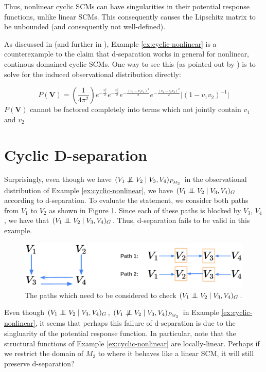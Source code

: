 \documentclass[12pt]{article}
\begin{document}
Thus, nonlinear cyclic SCMs can have singularities in their potential response functions, unlike linear SCMs. This consequently causes the Lipschitz matrix to be unbounded (and consequently not well-defined).


\begin{remark}
As discussed in \cite{Acyclification} (and further in \cite{Foundations}), Example \ref{ex:cyclic-nonlinear} is a counterexample to the claim that d-separation works in general for nonlinear, continous domained cyclic SCMs.
One way to see this (as pointed out by \cite{Acyclification}) is to solve for the induced observational distribution directly:

\[
P(\mathbf{V})=(\frac{1}{4\pi^2})e^{-\frac{v_1^2}{2}}e^{-\frac{v_2^2}{2}}e^{-\frac{(v_3-v_1v_4)^2}{2}}e^{-\frac{(v_4-v_2v_3)^2}{2}}\lvert(1-v_1v_2)^{-1}\rvert
\]
$P(\mathbf{V})$ cannot be factored completely into terms which not jointly contain $v_1$ and $v_2$
\end{remark}

\section{Cyclic D-separation}\label{cyclic-d-sep}

Surprisingly, even though we have $(V_1 \nCI V_2 \mid V_3,V_4)_{P_{M_3}}$ in the observational distribution of Example \ref{ex:cyclic-nonlinear}, we have $(V_1 \mathrel{\perp\mspace{-10mu}\perp} V_2 \mid V_3,V_4)_{G}$ according to d-separation. To evaluate the statement, we consider both paths from $V_1$ to $V_2$ as shown in Figure \ref{fig:paths}. Since each of these paths is blocked by $V_3$, $V_4$, we have that $(V_1 \mathrel{\perp\mspace{-10mu}\perp} V_2 \mid V_3,V_4)_{G}$.
Thus, d-separation fails to be valid in this example.

\begin{figure}
\centering
\includegraphics[width=0.7\linewidth]{pics/my_own/paths.png}
\caption{The paths which need to be considered to check $(V_1 \mathrel{\perp\mspace{-10mu}\perp} V_2 \mid V_3,V_4)_{G}$.}
\label{fig:paths}
\end{figure}


Even though $(V_1 \mathrel{\perp\mspace{-10mu}\perp} V_2 \mid V_3,V_4)_{G}$, $(V_1 \nCI V_2 \mid V_3,V_4)_{P_{M_3}}$ in Example \ref{ex:cyclic-nonlinear}, it seems that perhaps this failure of d-separation is due to the singluarity of the potential response function. 
In particular, note that the structural functions of Example \ref{ex:cyclic-nonlinear} are locally-linear. Perhaps if we restrict the domain of $M_3$ to where it behaves like a linear SCM, it will still preserve d-separation?
\end{document}
